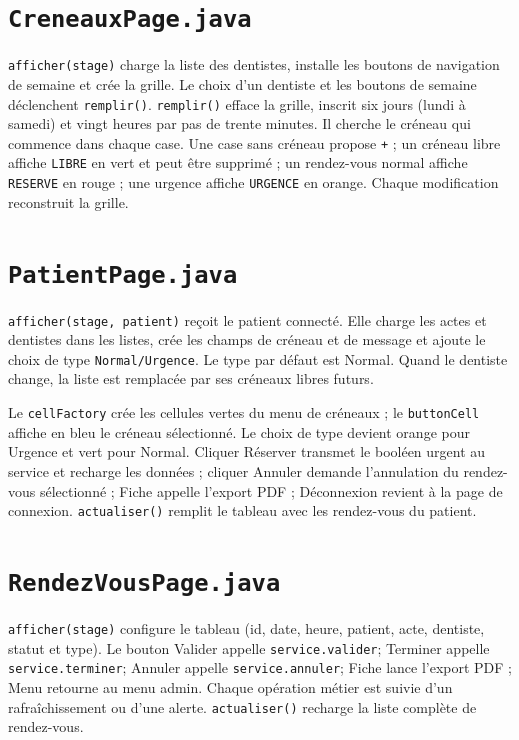 \documentclass[11pt,a4paper]{report}
\begin{document}
\section{\texttt{CreneauxPage.java}}
\texttt{afficher(stage)} charge la liste des dentistes, installe les boutons de navigation de semaine et crée la grille. Le choix d'un dentiste et les boutons de semaine déclenchent \texttt{remplir()}.
\texttt{remplir()} efface la grille, inscrit six jours (lundi à samedi) et vingt heures par pas de trente minutes. Il cherche le créneau qui commence dans chaque case. Une case sans créneau propose \texttt{+} ; un créneau libre affiche \texttt{LIBRE} en vert et peut être supprimé ; un rendez-vous normal affiche \texttt{RESERVE} en rouge ; une urgence affiche \texttt{URGENCE} en orange. Chaque modification reconstruit la grille.

\section{\texttt{PatientPage.java}}
\texttt{afficher(stage, patient)} reçoit le patient connecté. Elle charge les actes et dentistes dans les listes, crée les champs de créneau et de message et ajoute le choix de type \texttt{Normal/Urgence}. Le type par défaut est Normal. Quand le dentiste change, la liste est remplacée par ses créneaux libres futurs.

Le \texttt{cellFactory} crée les cellules vertes du menu de créneaux ; le \texttt{buttonCell} affiche en bleu le créneau sélectionné. Le choix de type devient orange pour Urgence et vert pour Normal. Cliquer Réserver transmet le booléen urgent au service et recharge les données ; cliquer Annuler demande l'annulation du rendez-vous sélectionné ; Fiche appelle l'export PDF ; Déconnexion revient à la page de connexion.
\texttt{actualiser()} remplit le tableau avec les rendez-vous du patient.

\section{\texttt{RendezVousPage.java}}
\texttt{afficher(stage)} configure le tableau (id, date, heure, patient, acte, dentiste, statut et type). Le bouton Valider appelle \texttt{service.valider}; Terminer appelle \texttt{service.terminer}; Annuler appelle \texttt{service.annuler}; Fiche lance l'export PDF ; Menu retourne au menu admin. Chaque opération métier est suivie d'un rafraîchissement ou d'une alerte.
\texttt{actualiser()} recharge la liste complète de rendez-vous.
\end{document}
